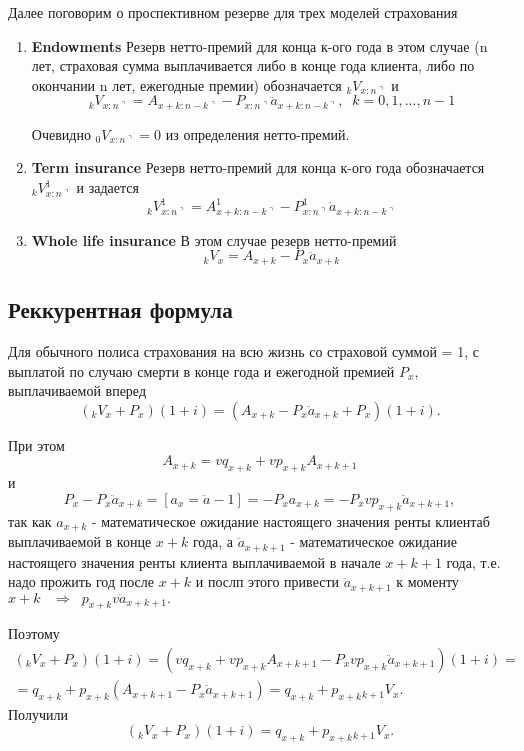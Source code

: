 Далее поговорим о проспективном резерве для трех моделей страхования 
\begin{enumerate}
	\item \textbf{Endowments}
	Резерв нетто-премий для конца к-ого года в этом случае (n лет, страховая сумма выплачивается либо в конце года клиента, либо по окончании n лет, ежегодные премии) обозначается $ {}_k V_{x:n\urcorner}$ и 
	\[ {}_k V_{x:n\urcorner} = A_{x+k:n-k\urcorner} - P_{x:n\urcorner}\ddot{a}_{x+k:n-k\urcorner}, \;\; k = 0,1,...,n-1 \]

	Очевидно $ {}_0 V_{x:n\urcorner} = 0$ из определения нетто-премий.
	\item \textbf{Term insurance}
	Резерв нетто-премий для конца к-ого года обозначается $ {}_kV_{x:n\urcorner}^{1}$ и задается 
	\[ {}_kV_{x:n\urcorner}^{1} = A_{x+k:n-k\urcorner}^{1} -P_{x:n\urcorner}^{1}\ddot{a}_{x+k:n-k\urcorner}\]

	\item \textbf{Whole life insurance}
	В этом случае резерв нетто-премий 
	\[ {}_kV_x = A_{x+k} - P_x \ddot{a}_{x+k}	 \]
\end{enumerate}

\subsection{Реккурентная формула} %
Для обычного полиса страхования на всю жизнь со страховой суммой = 1, с выплатой по случаю смерти в конце года и ежегодной премией $ P_x$, выплачиваемой вперед
\[ ({}_kV_x + P_x)(1+i) = (A_{x+k} - P_x \ddot{a}_{x+k} + P_x)(1+i). \]

При этом 
\[ A_{x+k}= vq_{x+k} + vp_{x+k}A_{x+k+1} \]
и
\[ P_x - P_x \ddot{a}_{x+k} = [a_x = \ddot{a}-1] = -P_xa_{x+k}=-P_xvp_{x+k}\ddot{a}_{x+k+1} , \]
так как $ a_{x+k}$ - математическое ожидание настоящего значения ренты клиентаб выплачиваемой в конце $ x+k$ года, а $ \ddot{a}_{x+k+1}$ - математическое ожидание настоящего значения ренты клиента выплачиваемой в начале $ x+k+1$ года, т.е. надо прожить год после $ x+k$ и послп этого привести $ \ddot{a}_{x+k+1}$ к моменту $ x+k\;\; \;\Rightarrow\;\;p_{x+k}v \ddot{a}_{x+k+1}.$

Поэтому 
\begin{gather*}
	({}_kV_x + P_x)(1+i) = (vq_{x+k} + vp_{x+k}A_{x+k+1} - P_xvp_{x+k}\ddot{a}_{x+k+1})(1+i)=\\
	=q_{x+k} +p_{x+k}(A_{x+k+1} -P_x\ddot{a}_{x+k+1}) = q_{x+k} +p_{x+k}{}_{k+1}V_x.
\end{gather*}
Получили
\[ ({}_kV_x+P_x)(1+i)=q_{x+k}+p_{x+k}{}_{k+1}V_x. \]

